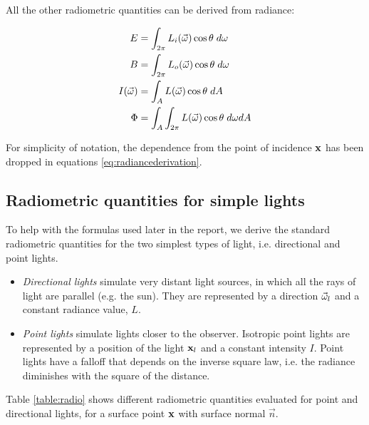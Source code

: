 All the other radiometric quantities can be derived from radiance:

\begin{equation}
\begin{split}
E &= \int_{2\pi} L_i(\vec{\omega}) \cos\theta \; d\omega \\
B &= \int_{2\pi} L_o(\vec{\omega}) \cos\theta \; d\omega \\
I(\vec{\omega}) &= \int_A L(\vec{\omega}) \cos\theta \; dA \\
\Phi &= \int_A \int_{2\pi} L(\vec{\omega}) \cos\theta \; d\omega dA
\end{split}
\label{eq:radiancederivation} 
\end{equation}

For simplicity of notation, the dependence from the point of incidence $\mathbf{x}$ has been dropped in equations \ref{eq:radiancederivation}. 

\subsection{Radiometric quantities for simple lights}

To help with the formulas used later in the report, we derive the standard radiometric quantities for the two simplest types of light, i.e. directional and point lights.
\begin{itemize}
	\item \textit{Directional lights} simulate very distant light sources, in which all the rays of light are parallel (e.g. the sun). They are represented by a direction $\vec{\omega}_l$ and a constant radiance value, $L$. 
	\item \textit{Point lights} simulate lights closer to the observer. Isotropic point lights are represented by a position of the light $\mathbf{x}_l$ and a constant intensity $I$. Point lights have a falloff that depends on the inverse square law, i.e. the radiance diminishes with the square of the distance.
\end{itemize}

Table \ref{table:radio} shows different radiometric quantities evaluated for point and directional lights, for a surface point $\mathbf{x}$ with surface normal $\vec{n}$. 

